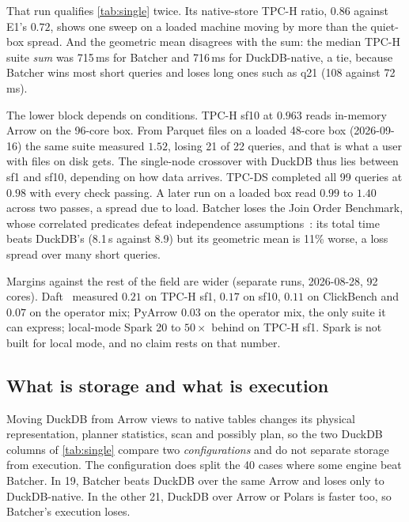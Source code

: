 \documentclass[10pt,twocolumn,letterpaper]{article}   %
\newcommand{\sys}{Batcher}
\newcommand{\E}[1]{\textsf{E#1}}
\begin{document}
That run qualifies \cref{tab:single} twice. Its native-store TPC-H ratio, $0.86$ against \E{1}'s
$0.72$, shows one sweep on a loaded machine moving by more than the quiet-box spread. And the
geometric mean disagrees with the sum: the median TPC-H suite \emph{sum} was 715\,ms for \sys{}
and 716\,ms for DuckDB-native, a tie, because \sys{} wins most short queries and loses long ones
such as q21 (108 against 72\,ms).

The lower block depends on conditions. TPC-H sf10 at $0.963$ reads in-memory Arrow on the
96-core box. From Parquet files on a loaded 48-core box (2026-09-16) the same suite measured
$1.52$, losing 21 of 22 queries, and that is what a user with files on disk gets. The
single-node crossover with DuckDB thus lies between sf1 and sf10, depending on how data arrives.
TPC-DS completed all 99 queries at $0.98$ with every check passing. A later run on a loaded box
read $0.99$ to $1.40$ across two passes, a spread due to load. \sys{} loses the Join Order
Benchmark, whose correlated predicates defeat independence assumptions~\cite{leis2015goodjoin}:
its total time beats DuckDB's (8.1\,s against 8.9) but its geometric mean is 11\% worse, a loss
spread over many short queries.

Margins against the rest of the field are wider (separate runs, 2026-08-28, 92 cores).
Daft~\cite{daft} measured $0.21$ on TPC-H sf1, $0.17$ on sf10, $0.11$ on ClickBench and $0.07$ on
the operator mix; PyArrow $0.03$ on the operator mix, the only suite it can express; local-mode
Spark 20 to $50\times$ behind on TPC-H sf1. Spark is not built for local mode, and no claim rests
on that number.

\subsection{What is storage and what is execution}
\label{sec:eval-storage}

Moving DuckDB from Arrow views to native tables changes its physical representation, planner
statistics, scan and possibly plan, so the two DuckDB columns of \cref{tab:single} compare two
\emph{configurations} and do not separate storage from execution. The configuration does split
the 40 cases where some engine beat \sys{}. In 19, \sys{} beats DuckDB over the same Arrow and
loses only to DuckDB-native. In the other 21, DuckDB over Arrow or Polars is faster too, so
\sys{}'s execution loses.
\end{document}
